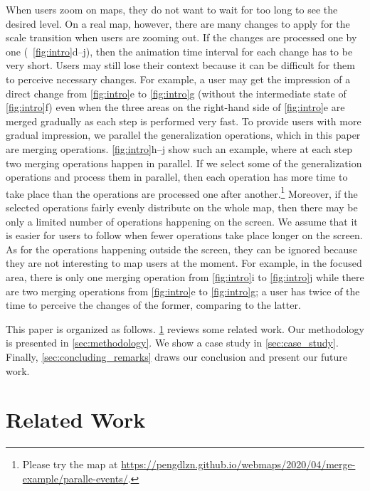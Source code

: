 \documentclass[ijgi,article,submit,moreauthors,pdftex]{Definitions/mdpi}
\begin{document}
When users zoom on maps, 
they do not want to wait for too long to see the desired level.
On a real map, however, 
there are many changes to apply for the scale transition 
when users are zooming out.
If the changes are processed one by one 
(\eg~\figs\ref{fig:intro}d--j),
then the animation time interval for each change has to be very short.
Users may still lose their context 
because it can be difficult for them to perceive necessary changes.
For example, a user may get the impression of
a direct change from \fig\ref{fig:intro}e to \fig\ref{fig:intro}g
(without the intermediate state of \fig\ref{fig:intro}f)
even when the three areas on the right-hand side of \fig\ref{fig:intro}e
are merged gradually as each step is performed very fast.
To provide users with more gradual impression, 
we parallel the generalization operations,
which in this paper are merging operations.
\figs\ref{fig:intro}h--j show such an example,
where at each step two merging operations happen in parallel.
If we select some of the generalization operations
and process them in parallel,
then each operation has more time to take place 
than the operations are processed one after another.\footnote{%
Please try the map at
\url{https://pengdlzn.github.io/webmaps/2020/04/merge-example/paralle-events/}.}
Moreover, if the selected operations
fairly evenly distribute on the whole map, 
then there may be only a limited number of operations 
happening on the screen.
We assume that it is easier for users to follow 
when fewer operations take place longer on the screen.
As for the operations happening outside the screen,
they can be ignored because 
they are not interesting to map users at the moment.
For example, in the focused area, there is only one merging operation 
from \fig\ref{fig:intro}i to \fig\ref{fig:intro}j
while there are two merging operations  
from \fig\ref{fig:intro}e to \fig\ref{fig:intro}g;
a user has twice of the time to perceive the changes of the former,
comparing to the latter.

This paper is organized as follows.
\sect\ref{sec:realted_work} reviews some related work.
Our methodology is presented in \sect\ref{sec:methodology}.
We show a case study in \sect\ref{sec:case_study}.
Finally, \sect\ref{sec:concluding_remarks} draws our conclusion
and present our future work.



 
\section{Related Work}
\label{sec:realted_work}
\end{document}
